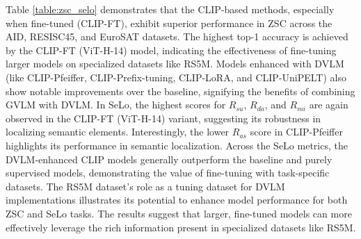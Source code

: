 \documentclass[journal]{IEEEtran}
\begin{document}
Table \ref{table:zsc_selo} demonstrates that the CLIP-based methods, especially when fine-tuned (CLIP-FT), exhibit superior performance in ZSC across the AID, RESISC45, and EuroSAT datasets. The highest top-1 accuracy is achieved by the CLIP-FT (ViT-H-14) model, indicating the effectiveness of fine-tuning larger models on specialized datasets like RS5M. Models enhanced with DVLM (like CLIP-Pfeiffer, CLIP-Prefix-tuning, CLIP-LoRA, and CLIP-UniPELT) also show notable improvements over the baseline, signifying the benefits of combining GVLM with DVLM. In SeLo, the highest scores for $R_{su}$, $R_{da}$, and $R_{mi}$ are again observed in the CLIP-FT (ViT-H-14) variant, suggesting its robustness in localizing semantic elements. Interestingly, the lower $R_{as}$ score in CLIP-Pfeiffer highlights its performance in semantic localization. Across the SeLo metrics, the DVLM-enhanced CLIP models generally outperform the baseline and purely supervised models, demonstrating the value of fine-tuning with task-specific datasets. The RS5M dataset's role as a tuning dataset for DVLM implementations illustrates its potential to enhance model performance for both ZSC and SeLo tasks. The results suggest that larger, fine-tuned models can more effectively leverage the rich information present in specialized datasets like RS5M.
\end{document}
